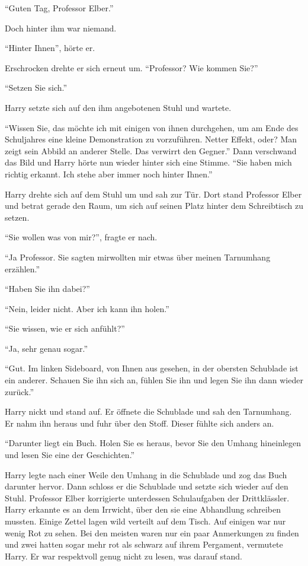 \enquote{Guten Tag, Professor Elber.}

Doch hinter ihm war niemand.

\enquote{Hinter Ihnen}, hörte er.

Erschrocken drehte er sich erneut um. \enquote{Professor? Wie kommen Sie\abs?}

\enquote{Setzen Sie sich.}

Harry setzte sich auf den ihm angebotenen Stuhl und wartete.

\enquote{Wissen Sie, das möchte ich mit einigen von ihnen durchgehen, um am Ende des Schuljahres eine kleine Demonstration zu vorzuführen. Netter Effekt, oder? Man zeigt sein Abbild an anderer Stelle. Das verwirrt den Gegner.} Dann verschwand das Bild und Harry hörte nun wieder hinter sich eine Stimme. \enquote{Sie haben mich richtig erkannt. Ich stehe aber immer noch hinter Ihnen.}

Harry drehte sich auf dem Stuhl um und sah zur Tür. Dort stand Professor Elber und betrat gerade den Raum, um sich auf seinen Platz hinter dem Schreibtisch zu setzen.

\enquote{Sie wollen was von mir?}, fragte er nach.

\enquote{Ja Professor. Sie sagten mir\abs wollten mir etwas über meinen Tarnumhang erzählen.}

\enquote{Haben Sie ihn dabei?}

\enquote{Nein, leider nicht. Aber ich kann ihn holen.}

\enquote{Sie wissen, wie er sich anfühlt?}

\enquote{Ja, sehr genau sogar.} 

\enquote{Gut. Im linken Sideboard, von Ihnen aus gesehen, in der obersten Schublade ist ein anderer. Schauen Sie ihn sich an, fühlen Sie ihn und legen Sie ihn dann wieder zurück.}

Harry nickt und stand auf. Er öffnete die Schublade und sah den Tarnumhang. Er nahm ihn heraus und fuhr über den Stoff. Dieser fühlte sich anders an.

\enquote{Darunter liegt ein Buch. Holen Sie es heraus, bevor Sie den Umhang hineinlegen und lesen Sie eine der Geschichten.}

Harry legte nach einer Weile den Umhang in die Schublade und zog das Buch darunter hervor. Dann schloss er die Schublade und setzte sich wieder auf den Stuhl. Professor Elber korrigierte unterdessen Schulaufgaben der Drittklässler. Harry erkannte es an dem Irrwicht, über den sie eine Abhandlung schreiben mussten. Einige Zettel lagen wild verteilt auf dem Tisch. Auf einigen war nur wenig Rot zu sehen. Bei den meisten waren nur ein paar Anmerkungen zu finden und zwei hatten sogar mehr rot als schwarz auf ihrem Pergament, vermutete Harry. Er war respektvoll genug nicht zu lesen, was darauf stand.

